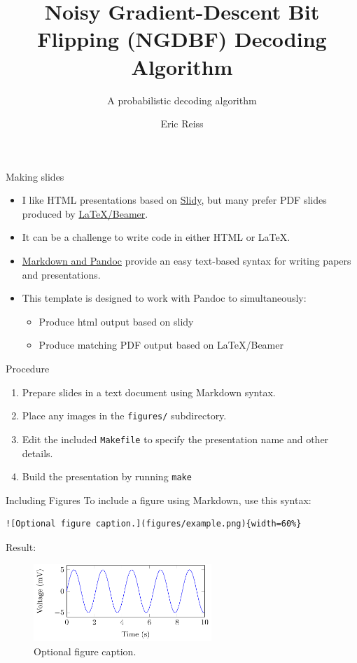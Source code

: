 \documentclass[10pt,ignorenonframetext,]{beamer}
\title{Noisy Gradient-Descent Bit Flipping (NGDBF) Decoding Algorithm}
\subtitle{A probabilistic decoding algorithm}
\author{Eric Reiss}
\date{}
\providecommand{\tightlist}{%
  \setlength{\itemsep}{0pt}\setlength{\parskip}{0pt}}
\begin{document}
\frame{\titlepage}

\begin{frame}{Making slides}
\protect\hypertarget{making-slides}{}
\begin{itemize}[<+->]
\item
  I like HTML presentations based on
  \href{https://www.w3.org/Talks/Tools/Slidy2/Overview.html}{Slidy}, but
  many prefer PDF slides produced by
  \href{https://www.ctan.org/pkg/beamer}{\LaTeX/Beamer}.
\item
  It can be a challenge to write code in either HTML or \LaTeX.
\item
  \href{}{Markdown and Pandoc} provide an easy text-based syntax for
  writing papers and presentations.\\
\item
  This template is designed to work with Pandoc to simultaneously:

  \begin{itemize}[<+->]
  \tightlist
  \item
    Produce html output based on slidy
  \item
    Produce matching PDF output based on \LaTeX/Beamer
  \end{itemize}
\end{itemize}
\end{frame}

\begin{frame}[fragile]{Procedure}
\protect\hypertarget{procedure}{}
\begin{enumerate}[<+->]
\tightlist
\item
  Prepare slides in a text document using Markdown syntax.
\item
  Place any images in the \texttt{figures/} subdirectory.
\item
  Edit the included \texttt{Makefile} to specify the presentation name
  and other details.
\item
  Build the presentation by running \texttt{make}
\end{enumerate}
\end{frame}

\begin{frame}[fragile]{Including Figures}
\protect\hypertarget{including-figures}{}
To include a figure using Markdown, use this syntax:

\begin{verbatim}
![Optional figure caption.](figures/example.png){width=60%}
\end{verbatim}

Result:

\begin{figure}
\centering
\includegraphics[width=0.6\textwidth,height=\textheight]{figures/example.png}
\caption{Optional figure caption.}
\end{figure}
\end{frame}
\end{document}

